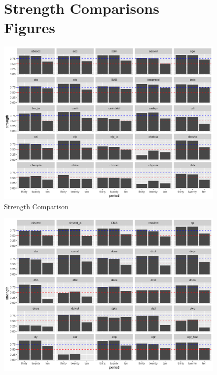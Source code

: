 \begin{landscape}
\begin{figure}[ht]
\section{Strength Comparisons Figures}\label{strength_figures}
			\centering
			\caption{Strength Comparison}
			\label{figure:strength_compare}
				\includegraphics[scale = 0.75]{strength_comparison_I}
\end{figure}
\end{landscape}



\begin{landscape}
\begin{figure}[ht]
		\includegraphics[scale = 0.75]{strength_comparison_II}
		\centering
	\end{figure}
\end{landscape}

